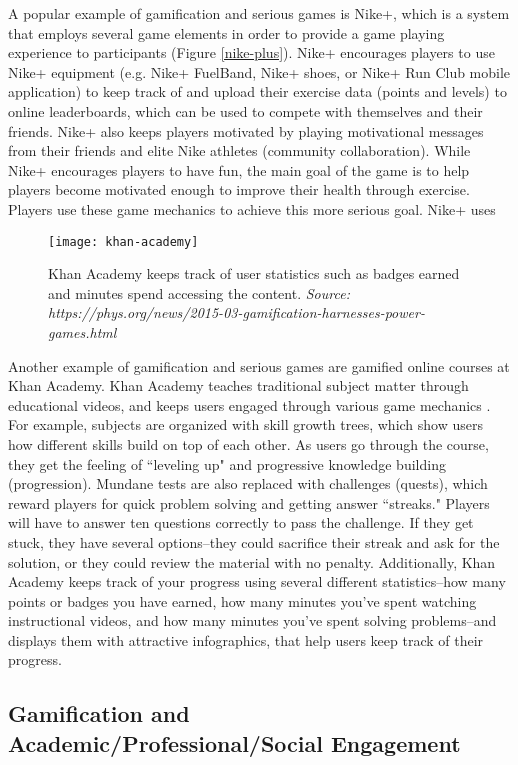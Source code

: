 A popular example of gamification and serious games is Nike+, which is a system that employs several game elements in order to provide a game playing experience to participants \cite{Nike} (Figure \ref{nike-plus}). Nike+ encourages players to use Nike+ equipment (e.g. Nike+ FuelBand, Nike+ shoes, or Nike+ Run Club mobile application) to keep track of and upload their exercise data (points and levels) to online leaderboards, which can be used to compete with themselves and their friends. Nike+ also keeps players motivated by playing motivational messages from their friends and elite Nike athletes (community collaboration). While Nike+ encourages players to have fun, the main goal of the game is to help players become motivated enough to improve their health through exercise. Players use these game mechanics to achieve this more serious goal. Nike+ uses 

\begin{figure}[h]
\centering
\texttt{[image: khan-academy]}
\caption{Khan Academy keeps track of user statistics such as badges earned and minutes spend accessing the content. \textit{Source: https://phys.org/news/2015-03-gamification-harnesses-power-games.html}}
\label{khan-academy}
\end{figure}	

Another example of gamification and serious games are gamified online courses at Khan Academy. Khan Academy teaches traditional subject matter through educational videos, and keeps users engaged through various game mechanics \cite{khan_academy}. For example, subjects are organized with skill growth trees, which show users how different skills build on top of each other. As users go through the course, they get the feeling of ``leveling up" and progressive knowledge building (progression). Mundane tests are also replaced with challenges (quests), which reward players for quick problem solving and getting answer ``streaks." Players will have to answer ten questions correctly to pass the challenge. If they get stuck, they have several options--they could sacrifice their streak and ask for the solution, or they could review the material with no penalty. Additionally, Khan Academy keeps track of your progress using several different statistics--how many points or badges you have earned, how many minutes you've spent watching instructional videos, and how many minutes you've spent solving problems--and displays them with attractive infographics, that help users keep track of their progress. 

\subsection{Gamification and Academic/Professional/Social Engagement}

